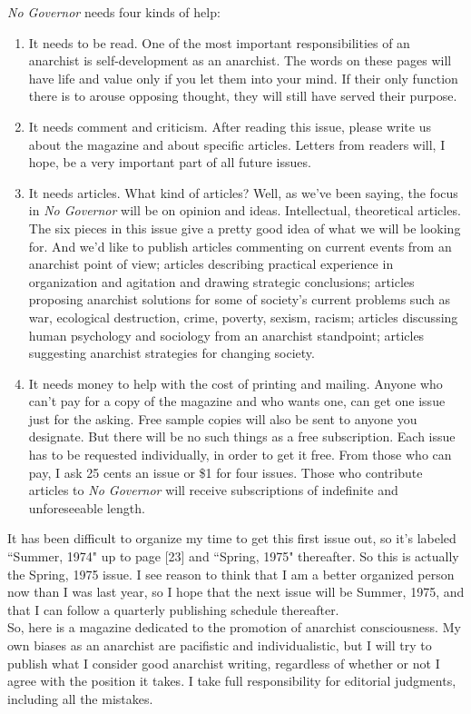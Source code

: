 \documentclass[12pt, onecolumn, letterpaper, oneside]{book}
\begin{document}
\emph{No Governor} needs four kinds of help:
\begin{enumerate}
\item It needs to be read. One of the most important responsibilities of an anarchist is self-development as an anarchist. The words on these pages will have life and value only if you let them into your mind. If their only function there is to arouse opposing thought, they will still have served their purpose.
\item It needs comment and criticism. After reading this issue, please write us about the magazine and about specific articles. Letters from readers will, I hope, be a very important part of all future issues.
\item It needs articles. What kind of articles? Well, as we've been saying, the focus in \emph{No Governor} will be on opinion and ideas. Intellectual, theoretical articles. The six pieces in this issue give a pretty good idea of what we will be looking for. And we'd like to publish articles commenting on current events from an anarchist point of view; articles describing practical experience in organization and agitation and drawing strategic conclusions; articles proposing anarchist solutions for some of society's current problems such as war, ecological destruction, crime, poverty, sexism, racism; articles discussing human psychology and sociology from an anarchist standpoint; articles suggesting anarchist strategies for changing society.
\item It needs money to help with the cost of printing and mailing. Anyone who can't pay for a copy of the magazine and who wants one, can get one issue just for the asking. Free sample copies will also be sent to anyone you designate. But there will be no such things as a free subscription. Each issue has to be requested individually, in order to get it free. From those who can pay, I ask 25 cents an issue or \$1 for four issues. Those who contribute articles to \emph{No Governor} will receive subscriptions of indefinite and unforeseeable length.
\end{enumerate}
It has been difficult to organize my time to get this first issue out, so it's labeled ``Summer, 1974" up to page [23] and ``Spring, 1975" thereafter. So this is actually the Spring, 1975 issue. I see reason to think that I am a better organized person now than I was last year, so I hope that the next issue will be Summer, 1975, and that I can follow a quarterly publishing schedule thereafter.\\
So, here is a magazine dedicated to the promotion of anarchist consciousness. My own biases as an anarchist are pacifistic and individualistic, but I will try to publish what I consider good anarchist writing, regardless of whether or not I agree with the position it takes. I take full responsibility for editorial judgments, including all the mistakes.
\end{document}
